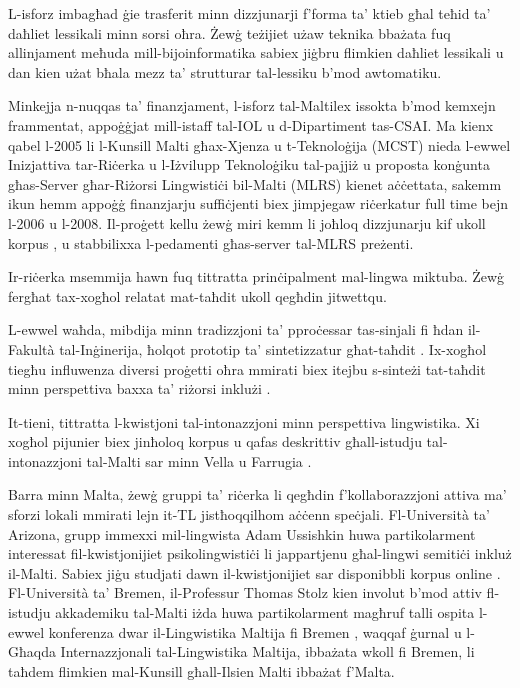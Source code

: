 \begin{multicols}{2}
L-isforz imbagħad ġie trasferit minn dizzjunarji f’forma ta’ ktieb għal teħid ta’ daħliet lessikali minn sorsi oħra. Żewġ teżijiet \cite{Dalli:2001, Attard:2005} użaw teknika bbażata fuq allinjament meħuda mill-bijoinformatika sabiex jiġbru flimkien daħliet lessikali u dan kien użat bħala mezz ta’ strutturar tal-lessiku b’mod awtomatiku.

Minkejja n-nuqqas ta’ finanzjament, l-isforz tal-Maltilex issokta b’mod kemxejn frammentat, appoġġjat mill-istaff tal-IOL u d-Dipartiment tas-CSAI. Ma kienx qabel l-2005 li l-Kunsill Malti għax-Xjenza u t-Teknoloġija (MCST) nieda l-ewwel Inizjattiva tar-Riċerka u l-Iżvilupp Teknoloġiku tal-pajjiż u proposta konġunta għas-Server għar-Riżorsi Lingwistiċi bil-Malti (MLRS) kienet aċċettata, sakemm ikun hemm appoġġ finanzjarju suffiċjenti biex jimpjegaw riċerkatur full time bejn l-2006 u l-2008. Il-proġett kellu żewġ miri kemm li joħloq dizzjunarju kif ukoll korpus \cite{Rosner:2009}, u stabbilixxa l-pedamenti għas-server tal-MLRS preżenti.

Ir-riċerka msemmija hawn fuq tittratta prinċipalment mal-lingwa miktuba. Żewġ fergħat tax-xogħol relatat mat-taħdit ukoll qegħdin jitwettqu. 

L-ewwel waħda, mibdija minn tradizzjoni ta’ pproċessar tas-sinjali fi ħdan il-Fakultà tal-Inġinerija, ħolqot prototip ta’ sintetizzatur għat-taħdit \cite{Micallef:1997}. Ix-xogħol tiegħu influwenza diversi proġetti oħra mmirati biex itejbu s-sinteżi tat-taħdit minn perspettiva baxxa ta’ riżorsi inklużi \cite{Calleja:2002, Farrugia:2005, Camilleri:2010, Borg-et-al:2011}.

It-tieni, tittratta l-kwistjoni tal-intonazzjoni \cite{Vella:2009} minn perspettiva lingwistika. Xi xogħol pijunier biex jinħoloq korpus u qafas deskrittiv għall-istudju tal-intonazzjoni tal-Malti sar minn Vella u Farrugia \cite{Vella-Farrugia:2006}.

Barra minn Malta, żewġ gruppi ta’ riċerka li qegħdin f’kollaborazzjoni attiva ma’ sforzi lokali mmirati lejn it-TL  jistħoqqilhom aċċenn speċjali.
Fl-Università ta’ Arizona, grupp immexxi mil-lingwista Adam Ussishkin huwa partikolarment interessat fil-kwistjonijiet psikolingwistiċi li jappartjenu għal-lingwi semitiċi inkluż il-Malti. Sabiex jiġu studjati dawn il-kwistjonijiet sar disponibbli korpus online \cite{Ussishkin-et-al:2009}.
Fl-Università ta’ Bremen, il-Professur Thomas Stolz kien involut b’mod attiv fl-istudju akkademiku tal-Malti iżda huwa partikolarment magħruf talli ospita l-ewwel konferenza dwar il-Lingwistika Maltija fi Bremen \cite{Comrie-et-al:2009}, waqqaf ġurnal \cite{GHILM2} u l-Għaqda Internazzjonali tal-Lingwistika Maltija, ibbażata wkoll fi Bremen, li taħdem flimkien mal-Kunsill għall-Ilsien Malti ibbażat f’Malta.


\end{multicols}
